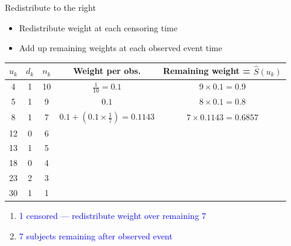 \documentclass[10pt,t]{beamer}
\begin{document}
\begin{frame}{Redistribute to the right}
	\begin{itemize}
		\item Redistribute weight at each censoring time
		\item Add up remaining weights at each observed event time
	\end{itemize}
	\begin{footnotesize}
		\begin{tabular}{|c|c|c|c|c|}
			\hline
			$u_k$ & $d_k$ & $n_k$ & Weight per obs. & Remaining weight = $\widehat{S}(u_k)$ \\
			\hline
			4 & 1 & 10 & $\frac{1}{10} = 0.1$ & $9\times 0.1= 0.9$\\
			5 & 1 & 9 & $0.1$ &  $8\times 0.1= 0.8$  \\
			8 & 1 & 7 & $0.1 + (0.1\times \frac{1}{7}) = 0.1143$ & $7 \times 0.1143 = 0.6857$\\
			12 & 0 & 6 & & \\
			13 & 1 & 5 & & \\
			18 & 0 & 4 & & \\
			23 & 2 & 3 & & \\
			30 & 1 & 1 & & \\
			\hline
		\end{tabular}
	\end{footnotesize}
	\begin{enumerate}
		\item \textcolor{blue}{1 censored --- redistribute weight over remaining 7}
		\item \textcolor{blue}{7 subjects remaining after observed event}
	\end{enumerate}
\end{frame}
\end{document}
